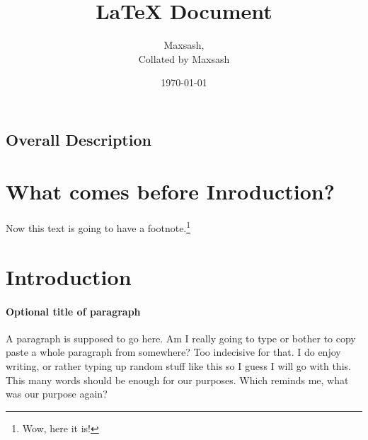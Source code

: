 \documentclass{article}
\title{LaTeX Document}
\author{Maxsash, \\Collated by Maxsash} %
\date{\today}
\begin{document}
	\maketitle

	\tableofcontents
	\pagebreak

	\pagestyle{empty}

	\begin{landscape}
		\section{Overall Description}
		\lipsum[1-2]
	\end{landscape}
		
	\section{What comes before Inroduction?}
		\lipsum[1-3]
		Now this text is going to have a footnote.\footnote{Wow, here it is!}

	\section{Introduction}

		\lipsum[1-10]

		\thispagestyle{headings}
		\setcounter{page}{503}

	\paragraph{Optional title of paragraph}
	A paragraph is supposed to go here. Am I really going to type or bother to copy paste a whole paragraph from somewhere? Too indecisive for that. I do enjoy writing, or rather typing up random stuff like this so I guess I will go with this. This many words should be enough for our purposes. Which reminds me, what was our purpose again?
\end{document}
